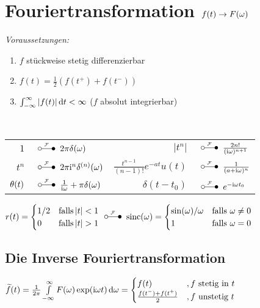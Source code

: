\documentclass[german,color,5pt]{latex4ei/latex4ei_fs}
\begin{document}
\section{Fouriertransformation $f(t) \rightarrow F(\omega)$}
\begin{sectionbox}
	\emph{Voraussetzungen:}
	\begin{enumerate}
		\item $f$ stückweise stetig differenzierbar
		\item $f(t) = \frac{1}{2}\left(f(t^+) + f(t^-)\right)$
		\item $\int_{-\infty}^{\infty}\abs{f(t)} \diff t < \infty$ ($f$ absolut integrierbar)
	\end{enumerate}
	 \\
	\begin{tabular}{rl|rl}
		$1$ & \!\!\!\!\!\!\!\!\!\! $\FT 2\pi \delta(\omega)$ & $|t^n|$ & \!\!\!\!\!\!\!\!\!\! $\FT \frac{2n!}{(\i \omega)^{n+1}}$\\
		$t^n$ & \!\!\!\!\!\!\!\!\!\! $\FT 2\pi \i^n \delta^{(n)}(\omega)$ & $\frac{t^{n-1}}{(n-1)!} e^{-at} u(t)$ & \!\!\!\!\!\!\!\!\!\! $\FT \frac{1}{(a+\i \omega)^n}$\\
		$\operatorname{\theta}(t)$ & \!\!\!\!\!\!\!\!\!\! $\FT \frac{1}{\i \omega} + \pi \delta(\omega)$ & $\delta(t-t_0)$ & \!\!\!\!\!\!\!\!\!\! $\FT e^{-\i \omega t_0}$\\
	\end{tabular}
	$r(t) = \begin{cases}
	1/2 & \text{falls} \abs{t}<1 \\
	0 & \text{falls} \abs{t}>1
	\end{cases}\FT \sinc(\omega) =  \begin{cases}
	\sin(\omega)/\omega & \text{falls } \omega\ne 0 \\
	1 & \text{falls } \omega= 0
	\end{cases}$
	\subsection{Die Inverse Fouriertransformation}
	$\widetilde{f}(t) = \frac{1}{2\pi} \int\limits_{-\infty}^\infty F(\omega) \exp(\i \omega t) \diff \omega = \begin{cases} f(t) &, f \text{ stetig in }t \\ \frac{f(t^-) + f(t^+)}{2} &, f\text{ unstetig }t \end{cases}$
\end{sectionbox}
\end{document}
